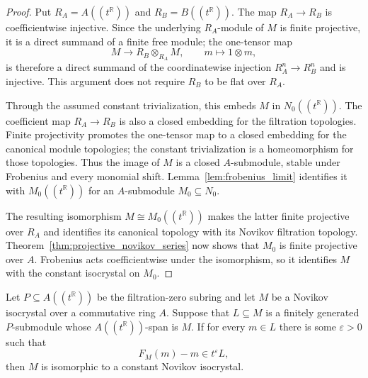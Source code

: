\begin{proof}
  \leanok
  Put $R_A=A((t^{\mathbb{R}}))$ and $R_B=B((t^{\mathbb{R}}))$.  The map
  $R_A\to R_B$ is coefficientwise injective.  Since the underlying
  $R_A$-module of $M$ is finite projective, it is a direct summand of a finite
  free module; the one-tensor map
  \[
    M\longrightarrow R_B\otimes_{R_A}M,
    \qquad m\longmapsto1\otimes m,
  \]
  is therefore a direct summand of the coordinatewise injection
  $R_A^n\to R_B^n$ and is injective.  This argument does not require $R_B$ to
  be flat over $R_A$.

  Through the assumed constant trivialization, this embeds $M$ in
  $N_0((t^{\mathbb{R}}))$.  The coefficient map $R_A\to R_B$ is also a closed
  embedding for the filtration topologies.  Finite projectivity promotes the
  one-tensor map to a closed embedding for the canonical module topologies;
  the constant trivialization is a homeomorphism for those topologies.  Thus
  the image of $M$ is a closed $A$-submodule, stable under Frobenius and every
  monomial shift.  Lemma~\ref{lem:frobenius_limit} identifies it with
  $M_0((t^{\mathbb{R}}))$ for an $A$-submodule $M_0\subseteq N_0$.

  The resulting isomorphism
  $M\cong M_0((t^{\mathbb{R}}))$ makes the latter finite projective over
  $R_A$ and identifies its canonical topology with its Novikov filtration
  topology.  Theorem~\ref{thm:projective_novikov_series} now shows that $M_0$
  is finite projective over $A$.  Frobenius acts coefficientwise under the
  isomorphism, so it identifies $M$ with the constant isocrystal on $M_0$.
\end{proof}

\begin{theorem}
  \label{prop:lattice_isocrystal}
  \leanok
  Let $P \subseteq A((t^{\mathbb{R}}))$ be the filtration-zero subring and let
  $M$ be a Novikov isocrystal over a commutative ring $A$. Suppose that
  $L \subseteq M$ is a finitely generated $P$-submodule whose
  $A((t^{\mathbb{R}}))$-span is $M$. If for every $m \in L$ there is some
  $\varepsilon>0$ such that
  \[
    F_M(m)-m \in t^\varepsilon L,
  \]
  then $M$ is isomorphic to a constant Novikov isocrystal.
\end{theorem}

